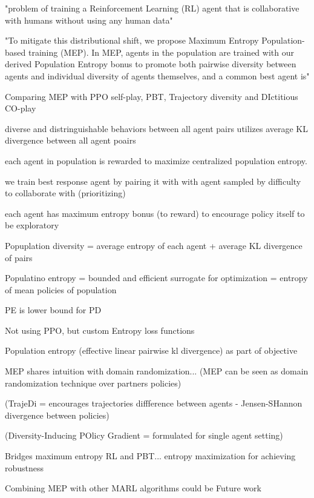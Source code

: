 \documentclass{report}
\begin{document}
\begin{list}{}{}
    \item "problem of training a Reinforcement Learning (RL) agent that is
    collaborative with humans without using any human data"
    \item "To mitigate this distributional shift, we propose Maximum Entropy Population-
    based training (MEP). In MEP, agents in the population are trained with our
    derived Population Entropy bonus to promote both pairwise diversity between
    agents and individual diversity of agents themselves, and a common best agent is"
    \item Comparing MEP with PPO self-play, PBT, Trajectory diversity and DIctitious CO-play
    \item diverse and distringuishable behaviors between all agent pairs utilizes average KL divergence between all agent poairs
    \item each agent in population is rewarded to maximize centralized population entropy.
    \item we train best response agent by pairing it with with agent sampled by difficulty to collaborate with (prioritizing)
    \item each agent has maximum entropy bonus (to reward) to encourage policy itself to be exploratory
    \item Popuplation diversity = average entropy of each agent + average KL divergence of pairs
    \item Populatino entropy = bounded and efficient surrogate for optimization = entropy of mean policies of population
    \item PE is lower bound for PD
    \item Not using PPO, but custom Entropy loss functions
    \item Population entropy (effective linear pairwise kl divergence) as part of objective
    \item MEP shares intuition with domain randomization... (MEP can be seen as domain randomization technique over partners policies)
    \item (TrajeDi = encourages trajectories diffference between agents - Jensen-SHannon divergence between policies)
    \item (Diversity-Inducing POlicy Gradient = formulated for single agent setting)
    \item Bridges maximum entropy RL and PBT... entropy maximization for achieving robustness
    \item Combining MEP with other MARL algorithms could be Future work

\end{list}
\end{document}
